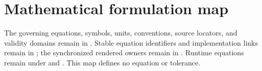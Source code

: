 \documentclass{article}
\begin{document}
\section{Mathematical formulation map}
The governing equations, symbols, units, conventions, source locators, and
validity domains remain in . Stable
equation identifiers and implementation links remain in
; the synchronized rendered owners remain
in . Runtime equations remain under  and
. This map defines no equation or tolerance.
\end{document}
